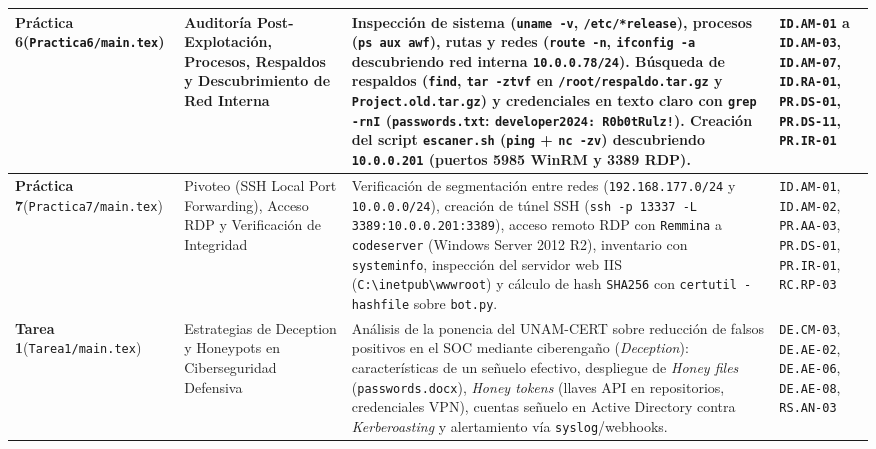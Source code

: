 \documentclass[letterpaper,11pt]{article}
\begin{document}
\begin{longtable}{|L{2.8cm}|L{3.5cm}|L{6.2cm}|C{3.8cm}|}
\textbf{Práctica 6}\newline (\texttt{Practica6/main.tex}) &
Auditoría Post-Explotación, Procesos, Respaldos y Descubrimiento de Red Interna &
Inspección de sistema (\texttt{uname -v}, \texttt{/etc/*release}), procesos (\texttt{ps aux awf}), rutas y redes (\texttt{route -n}, \texttt{ifconfig -a} descubriendo red interna \texttt{10.0.0.78/24}). Búsqueda de respaldos (\texttt{find}, \texttt{tar -ztvf} en \texttt{/root/respaldo.tar.gz} y \texttt{Project.old.tar.gz}) y credenciales en texto claro con \texttt{grep -rnI} (\texttt{passwords.txt}: \texttt{developer2024: R0b0tRulz!}). Creación del script \texttt{escaner.sh} (\texttt{ping} + \texttt{nc -zv}) descubriendo \texttt{10.0.0.201} (puertos 5985 WinRM y 3389 RDP). &
\texttt{ID.AM-01} a \texttt{ID.AM-03}, \texttt{ID.AM-07}, \texttt{ID.RA-01}, \texttt{PR.DS-01}, \texttt{PR.DS-11}, \texttt{PR.IR-01} \\
\hline

\textbf{Práctica 7}\newline (\texttt{Practica7/main.tex}) &
Pivoteo (SSH Local Port Forwarding), Acceso RDP y Verificación de Integridad &
Verificación de segmentación entre redes (\texttt{192.168.177.0/24} y \texttt{10.0.0.0/24}), creación de túnel SSH (\texttt{ssh -p 13337 -L 3389:10.0.0.201:3389}), acceso remoto RDP con \texttt{Remmina} a \texttt{codeserver} (Windows Server 2012 R2), inventario con \texttt{systeminfo}, inspección del servidor web IIS (\texttt{C:\textbackslash inetpub\textbackslash wwwroot}) y cálculo de hash \texttt{SHA256} con \texttt{certutil -hashfile} sobre \texttt{bot.py}. &
\texttt{ID.AM-01}, \texttt{ID.AM-02}, \texttt{PR.AA-03}, \texttt{PR.DS-01}, \texttt{PR.IR-01}, \texttt{RC.RP-03} \\
\hline

\textbf{Tarea 1}\newline (\texttt{Tarea1/main.tex}) &
Estrategias de Deception y Honeypots en Ciberseguridad Defensiva &
Análisis de la ponencia del UNAM-CERT sobre reducción de falsos positivos en el SOC mediante ciberengaño (\textit{Deception}): características de un señuelo efectivo, despliegue de \textit{Honey files} (\texttt{passwords.docx}), \textit{Honey tokens} (llaves API en repositorios, credenciales VPN), cuentas señuelo en Active Directory contra \textit{Kerberoasting} y alertamiento vía \texttt{syslog}/webhooks. &
\texttt{DE.CM-03}, \texttt{DE.AE-02}, \texttt{DE.AE-06}, \texttt{DE.AE-08}, \texttt{RS.AN-03} \\
\hline


\end{longtable}
\end{document}
